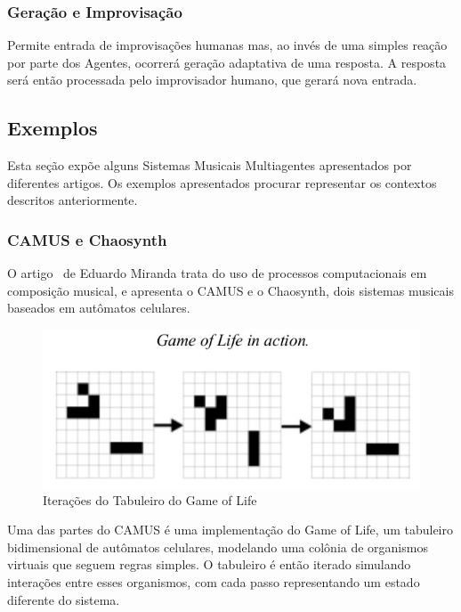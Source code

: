 \documentclass[a4paper, 11pt, twoside]{article}
\begin{document}
\begin{multicols}{2}
\subsubsection{Geração e Improvisação}

Permite entrada de improvisações humanas mas, ao invés de uma simples reação 
por parte dos Agentes, ocorrerá geração adaptativa de uma resposta. A resposta 
será então processada pelo improvisador humano, que gerará nova entrada.

\subsection{Exemplos}

Esta seção expõe alguns Sistemas Musicais Multiagentes 
apresentados por diferentes artigos. Os exemplos apresentados procurar 
representar os contextos descritos anteriormente.

\subsubsection{CAMUS e Chaosynth}

O artigo~\cite{miranda2003music} de Eduardo Miranda trata do uso de processos 
computacionais em composição musical, e apresenta o CAMUS e o Chaosynth, dois 
sistemas musicais baseados em autômatos celulares.

\begin{figure}[H]
  \centering
  \includegraphics[scale=0.52]{gameoflife1.jpg}
  \caption{Iterações do Tabuleiro do Game of Life~\cite{miranda2003music}}
  \label{fig:game1}

\end{figure}

Uma das partes do CAMUS é uma implementação do Game of Life, um tabuleiro 
bidimensional de autômatos celulares, modelando uma colônia de organismos 
virtuais que seguem regras simples. O tabuleiro é então iterado simulando
interações entre esses organismos, com cada passo representando um estado 
diferente do sistema.


\end{multicols}
\end{document}
